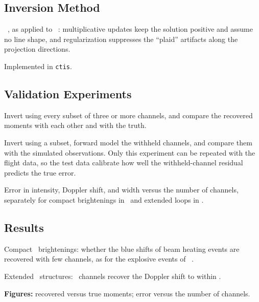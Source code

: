 %
\subsection{Inversion Method}%
\label{subsec:InversionMethod}%

\begin{outline}
\item \MARTCapital~\citep{Gordon1970}, as applied to \ESISI~\citep[][Appendix~B]{Parker2022}:
    multiplicative updates keep the solution positive and assume no line shape, and regularization
    suppresses the ``plaid'' artifacts along the projection directions.
\item Implemented in \texttt{ctis}.
\end{outline}

%
\subsection{Validation Experiments}%
\label{subsec:ValidationExperiments}%

\begin{outline}
\item Invert using every subset of three or more channels, and compare the recovered moments with
    each other and with the truth.
\item Invert using a subset, forward model the withheld channels, and compare them with the
    simulated observations.
    Only this experiment can be repeated with the flight data, so the test data calibrate how well
    the withheld-channel residual predicts the true error.
\item Error in intensity, Doppler shift, and width versus the number of channels, separately for
    compact brightenings in \NeVII\ and extended loops in \SiXII.
\end{outline}

%
\subsection{Results}%
\label{subsec:Results}%

\begin{outline}
\item Compact \NeVII\ brightenings: whether the blue shifts of beam heating events are recovered
    with few channels, as for the explosive events of \ESISI~\citep{Parker2022}.
\item Extended \SiXII\ structures: \numChannelsRequired\ channels recover the Doppler shift to
    within \velocityError.
\item \textbf{Figures:} recovered versus true moments; error versus the number of channels.
\end{outline}
